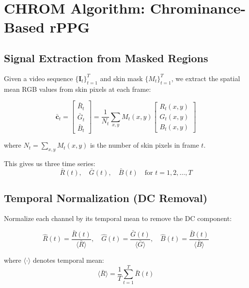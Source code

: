 \documentclass[11pt,a4paper]{article}
\newcommand{\vect}[1]{\bm{#1}}
\newcommand{\mat}[1]{\mathbf{#1}}
\begin{document}
\section{CHROM Algorithm: Chrominance-Based rPPG}

\subsection{Signal Extraction from Masked Regions}

Given a video sequence $\{\mat{I}_t\}_{t=1}^{T}$ and skin mask $\{M_t\}_{t=1}^{T}$, we extract the spatial mean RGB values from skin pixels at each frame:

\begin{equation}
\bar{\vect{c}}_t = \begin{bmatrix} \bar{R}_t \\ \bar{G}_t \\ \bar{B}_t \end{bmatrix} = \frac{1}{N_t} \sum_{x,y} M_t(x,y) \begin{bmatrix} R_t(x,y) \\ G_t(x,y) \\ B_t(x,y) \end{bmatrix}
\end{equation}

where $N_t = \sum_{x,y} M_t(x,y)$ is the number of skin pixels in frame $t$.

This gives us three time series:
\begin{equation}
\bar{R}(t), \quad \bar{G}(t), \quad \bar{B}(t) \quad \text{for } t = 1, 2, \ldots, T
\end{equation}

\subsection{Temporal Normalization (DC Removal)}

Normalize each channel by its temporal mean to remove the DC component:

\begin{equation}
\hat{R}(t) = \frac{\bar{R}(t)}{\langle \bar{R} \rangle}, \quad
\hat{G}(t) = \frac{\bar{G}(t)}{\langle \bar{G} \rangle}, \quad
\hat{B}(t) = \frac{\bar{B}(t)}{\langle \bar{B} \rangle}
\end{equation}

where $\langle \cdot \rangle$ denotes temporal mean:
\begin{equation}
\langle \bar{R} \rangle = \frac{1}{T} \sum_{t=1}^{T} \bar{R}(t)
\end{equation}
\end{document}
